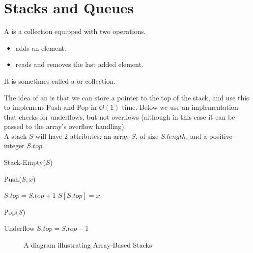 \documentclass[11pt]{report}
\begin{document}
\section{Stacks and Queues}
\begin{defi}[Stack]
    A  is a collection equipped with two operations.
    \begin{itemize}
        \item {} adds an element.
        \item {} reads and removes the last added element.
    \end{itemize}
    It is sometimes called a  or  collection. 
\end{defi}
\begin{impl} The idea of an  is that we can store a pointer to the top of the stack, and use this to implement Push and Pop in $O(1)$ time. Below we use an implementation that checks for underflows, but not overflows (although in this case it can be passed to the array's overflow handling).
    \\ A stack $S$ will have 2 attributes: an array $S$, of size $S.length$, and a positive integer $S.top$.
    \mypar
    \begin{algorithm}[H]
        \caption{Stack-Empty($S$)}
    \end{algorithm}
    \begin{algorithm}[H]
        \caption{Push($S, x$)}
        $S.top = S.top + 1$\;
        $S[S.top] = x$\;
    \end{algorithm}
    \begin{algorithm}[H]
        \caption{Pop($S$)}
        {
            \Error Underflow\;
        }
        \Else
        {
            $S.top = S.top - 1$\;
            \;
        }
    \end{algorithm}
    \begin{figure}[H]
        \caption{A diagram illustrating Array-Based Stacks}
        \centering
\end{figure}
\end{impl}
\end{document}
